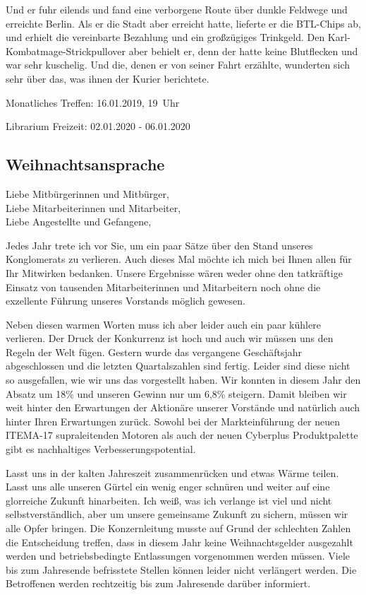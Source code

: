 \documentclass[]{multiversum}
\begin{document}
Und er fuhr eilends und fand eine verborgene Route über dunkle Feldwege und erreichte Berlin.
Als er die Stadt aber erreicht hatte, lieferte er die BTL-Chips ab, und erhielt die vereinbarte Bezahlung und ein großzügiges Trinkgeld.
Den Karl-Kombatmage-Strickpullover aber behielt er, denn der hatte keine Blutflecken und war sehr kuschelig.
Und die, denen er von seiner Fahrt erzählte, wunderten sich sehr über das, was ihnen der Kurier berichtete.

\begin{termine}
  \item Monatliches Treffen: 16.01.2019, 19~Uhr
  \item Librarium Freizeit: 02.01.2020 - 06.01.2020
\end{termine}

\subsection{Weihnachtsansprache }
Liebe Mitbürgerinnen und Mitbürger,\\
Liebe Mitarbeiterinnen und Mitarbeiter,\\
Liebe Angestellte und Gefangene,

Jedes Jahr trete ich vor Sie, um ein paar Sätze über den Stand unseres
Konglomerats zu verlieren. Auch dieses Mal möchte ich mich bei Ihnen
allen für Ihr Mitwirken bedanken. Unsere Ergebnisse wären weder ohne den
tatkräftige Einsatz von tausenden Mitarbeiterinnen und Mitarbeitern noch
ohne die exzellente Führung unseres Vorstands möglich gewesen.

Neben diesen warmen Worten muss ich aber leider auch ein paar kühlere
verlieren. Der Druck der Konkurrenz ist hoch und auch wir müssen uns den
Regeln der Welt fügen. Gestern wurde das vergangene Geschäftsjahr
abgeschlossen und die letzten Quartalszahlen sind fertig. Leider sind
diese nicht so ausgefallen, wie wir uns das vorgestellt haben.
Wir konnten in diesem Jahr den Absatz um 18\% und unseren
Gewinn nur um 6,8\% steigern. Damit bleiben wir weit hinter den
Erwartungen der Aktionäre unserer Vorstände und natürlich auch hinter
Ihren Erwartungen zurück.
Sowohl bei der Markteinführung der neuen ITEMA-17 supraleitenden Motoren
als auch der neuen Cyberplus Produktpalette gibt es nachhaltiges Verbesserungspotential.

Lasst uns in der kalten Jahreszeit zusammenrücken und etwas Wärme
teilen. Lasst uns alle unseren Gürtel ein wenig enger schnüren und weiter auf
eine glorreiche Zukunft hinarbeiten. Ich weiß, was ich verlange ist
viel und nicht selbstverständlich, aber um unsere gemeinsame Zukunft zu
sichern, müssen wir alle Opfer bringen. Die Konzernleitung musste auf
Grund der schlechten Zahlen die Entscheidung treffen, dass in diesem
Jahr keine Weihnachtsgelder ausgezahlt werden und betriebsbedingte Entlassungen 
vorgenommen werden müssen. Viele bis zum Jahresende befrisstete Stellen können leider nicht verlängert werden.
Die Betroffenen werden rechtzeitig bis zum Jahresende darüber informiert.
\end{document}
